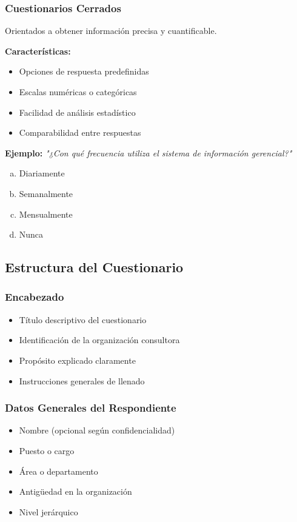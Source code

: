 \documentclass[12pt,letterpaper,oneside]{book}
\begin{document}
\subsubsection{Cuestionarios Cerrados}

Orientados a obtener información precisa y cuantificable.

\textbf{Características:}
\begin{itemize}
\item Opciones de respuesta predefinidas
\item Escalas numéricas o categóricas
\item Facilidad de análisis estadístico
\item Comparabilidad entre respuestas
\end{itemize}

\textbf{Ejemplo:}
\textit{"¿Con qué frecuencia utiliza el sistema de información gerencial?"}
\begin{enumerate}[a)]
\item Diariamente
\item Semanalmente
\item Mensualmente
\item Nunca
\end{enumerate}

\subsection{Estructura del Cuestionario}

\subsubsection{Encabezado}

\begin{itemize}
\item Título descriptivo del cuestionario
\item Identificación de la organización consultora
\item Propósito explicado claramente
\item Instrucciones generales de llenado
\end{itemize}

\subsubsection{Datos Generales del Respondiente}

\begin{itemize}
\item Nombre (opcional según confidencialidad)
\item Puesto o cargo
\item Área o departamento
\item Antigüedad en la organización
\item Nivel jerárquico
\end{itemize}
\end{document}
